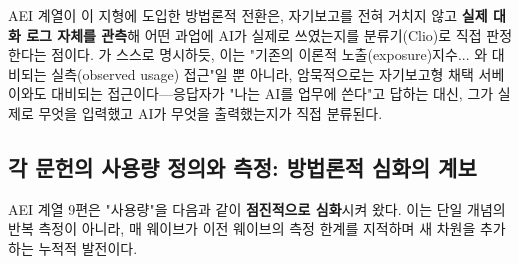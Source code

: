 \documentclass[11pt]{article}
\begin{document}
AEI 계열이 이 지형에 도입한 방법론적 전환은, 자기보고를 전혀 거치지 않고 \textbf{실제 대화 로그 자체를 관측}해 어떤 과업에 AI가 실제로 쓰였는지를 분류기(Clio)로 직접 판정한다는 점이다. \citet{handa-2025-which-economic-tasks-are}가 스스로 명시하듯, 이는 "기존의 이론적 노출(exposure)지수... 와 대비되는 실측(observed usage) 접근"일 뿐 아니라, 암묵적으로는 자기보고형 채택 서베이와도 대비되는 접근이다—응답자가 "나는 AI를 업무에 쓴다"고 답하는 대신, 그가 실제로 무엇을 입력했고 AI가 무엇을 출력했는지가 직접 분류된다.

\subsection{각 문헌의 사용량 정의와 측정: 방법론적 심화의 계보}

AEI 계열 9편은 "사용량"을 다음과 같이 \textbf{점진적으로 심화}시켜 왔다. 이는 단일 개념의 반복 측정이 아니라, 매 웨이브가 이전 웨이브의 측정 한계를 지적하며 새 차원을 추가하는 누적적 발전이다.
\end{document}
